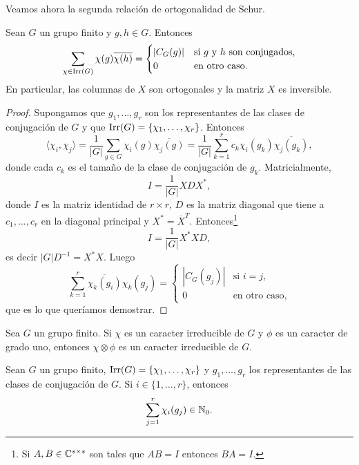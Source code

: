 Veamos ahora la segunda relación de ortogonalidad de Schur.

\begin{theorem}
  Sean $G$ un grupo finito y $g,h\in G$. 
  Entonces
  \[
	\sum_{\chi\in\operatorname{Irr}(G)}\chi(g)\overline{\chi(h)}=\begin{cases}
	  |C_G(g)| & \text{si $g$ y $h$ son conjugados,}\\
	  0 & \text{en otro caso.}
	\end{cases}
  \]
  En particular, las columnas de $X$ son ortogonales y la matriz $X$ es
  inversible.
\end{theorem}

\begin{proof}
  Supongamos que $g_1,\dots,g_r$ son los representantes de las clases de
  conjugación de $G$ y que $\operatorname{Irr}(G)=\{\chi_1,\dots,\chi_r\}$. Entonces
  \[
    \langle\chi_i,\chi_j\rangle
    =\frac{1}{|G|}\sum_{g\in G}\chi_i(g)\overline{\chi_j(g)}
    =\frac{1}{|G|}\sum_{k=1}^rc_k\chi_i(g_k)\overline{\chi_j(g_k)},
  \]
  donde cada $c_k$ es el tamaño de la clase de conjugación de $g_k$. Matricialmente,
  \[
    I=\frac{1}{|G|}XD X^*,
  \]
  donde $I$ es la matriz identidad de $r\times r$, $D$ es la matriz diagonal
  que tiene a $c_1,\dots,c_r$ en la diagonal principal y
  $X^*=\overline{X}^T$. Entonces\footnote{Si $A,B\in\mathbb{C}^{s\times s}$ son tales que  
  $AB=I$ entonces $BA=I$.}
  \[
	I=\frac{1}{|G|}X^*XD,
  \]
  es decir $|G|D^{-1}=X^*X$. Luego 
  \[
    \sum_{k=1}^r\overline{\chi_k(g_i)}\chi_k(g_j)=\begin{cases}
    |C_G(g_j)| & \text{si $i=j$},\\
    0 & \text{en otro caso},
    \end{cases}
  \]
  que es lo que queríamos demostrar.
\end{proof}

\begin{exercise}
Sea $G$ un grupo finito. Si $\chi$ es un caracter irreducible de $G$ y $\phi$ es un caracter de grado uno, entonces
$\chi\otimes\phi$ es un caracter irreducible de $G$. 
\end{exercise}

\begin{theorem}[Solomon]
  \label{theorem:Solomon}
  Sean $G$ un grupo finito, $\operatorname{Irr}(G)=\{\chi_1,\dots,\chi_r\}$ y $g_1,\dots,g_r$ los 
  representantes de las clases de conjugación de $G$. 
  Si $i\in\{1,\dots,r\}$, entonces 
  \[
	  \sum_{j=1}^r\chi_i(g_j)\in\mathbb{N}_0.
  \]
\end{theorem}

